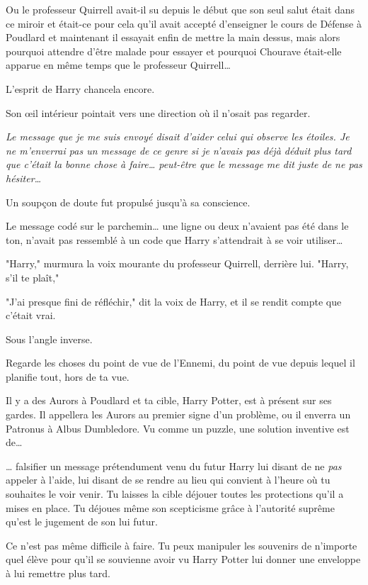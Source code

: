 Ou le professeur Quirrell avait-il su depuis le début que son seul salut était dans ce miroir et était-ce pour cela qu'il avait accepté d'enseigner le cours de Défense à Poudlard et maintenant il essayait enfin de mettre la main dessus, mais alors pourquoi attendre d'être malade pour essayer et pourquoi Chourave était-elle apparue en même temps que le professeur Quirrell…

L'esprit de Harry chancela encore.

Son œil intérieur pointait vers une direction où il n'osait pas regarder.

\emph{Le message que je me suis envoyé disait d'aider celui qui observe les étoiles. Je ne m'enverrai pas un message de ce genre si je n'avais pas déjà déduit plus tard que c'était la bonne chose à faire… peut-être que le message me dit juste de ne pas hésiter…}

Un soupçon de doute fut propulsé jusqu'à sa conscience.

Le message codé sur le parchemin… une ligne ou deux n'avaient pas été dans le ton, n'avait pas ressemblé à un code que Harry s'attendrait à se voir utiliser…

"Harry," murmura la voix mourante du professeur Quirrell, derrière lui. "Harry, s'il te plaît,"

"J'ai presque fini de réfléchir," dit la voix de Harry, et il se rendit compte que c'était vrai.

Sous l'angle inverse.

Regarde les choses du point de vue de l'Ennemi, du point de vue depuis lequel il planifie tout, hors de ta vue.

Il y a des Aurors à Poudlard et ta cible, Harry Potter, est à présent sur ses gardes. Il appellera les Aurors au premier signe d'un problème, ou il enverra un Patronus à Albus Dumbledore. Vu comme un puzzle, une solution inventive est de…

… falsifier un message prétendument venu du futur Harry lui disant de ne \emph{pas} appeler à l'aide, lui disant de se rendre au lieu qui convient à l'heure où tu souhaites le voir venir. Tu laisses la cible déjouer toutes les protections qu'il a mises en place. Tu déjoues même son scepticisme grâce à l'autorité suprême qu'est le jugement de son lui futur.

Ce n'est pas même difficile à faire. Tu peux manipuler les souvenirs de n'importe quel élève pour qu'il se souvienne avoir vu Harry Potter lui donner une enveloppe à lui remettre plus tard.

